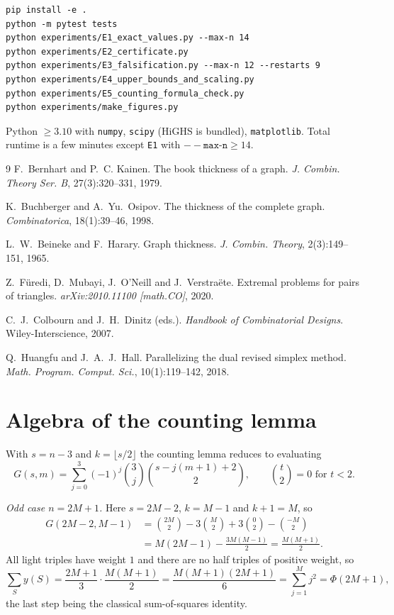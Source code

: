 \documentclass[11pt,a4paper]{article}
\theoremstyle{definition}
\begin{document}
\begin{verbatim}
pip install -e .
python -m pytest tests
python experiments/E1_exact_values.py --max-n 14
python experiments/E2_certificate.py
python experiments/E3_falsification.py --max-n 12 --restarts 9
python experiments/E4_upper_bounds_and_scaling.py
python experiments/E5_counting_formula_check.py
python experiments/make_figures.py
\end{verbatim}
Python $\ge 3.10$ with \texttt{numpy}, \texttt{scipy} (HiGHS is bundled),
\texttt{matplotlib}. Total runtime is a few minutes except \texttt{E1} with
$--\texttt{max-n} \ge 14$.

\begin{thebibliography}{9}
F.~Bernhart and P.~C. Kainen.
\newblock The book thickness of a graph.
\newblock \emph{J. Combin. Theory Ser. B}, 27(3):320--331, 1979.

K.~Buchberger and A.~Yu.~Osipov.
\newblock The thickness of the complete graph.
\newblock \emph{Combinatorica}, 18(1):39--46, 1998.

L.~W.~Beineke and F.~Harary.
\newblock Graph thickness.
\newblock \emph{J. Combin. Theory}, 2(3):149--151, 1965.

Z.~F\"uredi, D.~Mubayi, J.~O'Neill and J.~Verstra\"ete.
\newblock Extremal problems for pairs of triangles.
\newblock \emph{arXiv:2010.11100 [math.CO]}, 2020.

C.~J.~Colbourn and J.~H.~Dinitz (eds.).
\newblock \emph{Handbook of Combinatorial Designs}.
\newblock Wiley-Interscience, 2007.

Q.~Huangfu and J.~A.~J.~Hall.
\newblock Parallelizing the dual revised simplex method.
\newblock \emph{Math. Program. Comput. Sci.}, 10(1):119--142, 2018.
\end{thebibliography}

\appendix

\section{Algebra of the counting lemma}\label{app:counting}

With $s = n-3$ and $k = \lfloor s/2 \rfloor$ the counting lemma reduces to
evaluating
\[
  G(s,m) = \sum_{j=0}^{3} (-1)^j \binom{3}{j}\binom{s - j(m+1) + 2}{2},
  \qquad \binom{t}{2} = 0 \text{ for } t < 2.
\]

\emph{Odd case $n = 2M+1$.} Here $s = 2M-2$, $k = M-1$ and $k+1 = M$, so
\begin{align*}
G(2M-2, M-1) &= \binom{2M}{2} - 3\binom{M}{2} + 3\binom{0}{2} - \binom{-M}{2} \\
             &= M(2M-1) - \tfrac{3M(M-1)}{2} = \frac{M(M+1)}{2}.
\end{align*}
All light triples have weight $1$ and there are no half triples of positive
weight, so
\[
\sum_S y(S) = \frac{2M+1}{3}\cdot\frac{M(M+1)}{2}
            = \frac{M(M+1)(2M+1)}{6} = \sum_{j=1}^{M} j^{2} = \Phi(2M+1),
\]
the last step being the classical sum-of-squares identity.
\end{document}
